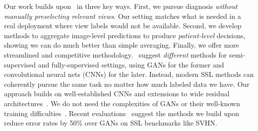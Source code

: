 Our work builds upon~\citet{madaniDeepEchocardiographyDataefficient2018} in three key ways.
First, we pursue diagnosis \emph{without manually preselecting relevant views}. Our setting matches what is needed in a real deployment where view labels would not be available.
Second, we develop methods to aggregate image-level predictions to produce \emph{patient-level} decisions, showing we can do much better than simple averaging.
Finally, we offer more streamlined and competitive methodology.~\citet{madaniDeepEchocardiographyDataefficient2018} suggest \emph{different} methods for semi-supervised and fully-supervised settings, using GANs for the former and convolutional neural nets (CNNs) for the later.
Instead, modern SSL methods can coherently pursue the same task no matter how much labeled data we have.
Our approach builds on well-established CNNs and extensions to wide residual architectures~\citep{zagoruykoWideResidualNetworks2017}.
We do not need the complexities of GANs or their well-known training difficulties~\citep{metzUnrolledGenerativeAdversarial2017,aroraGANsActuallyLearn2017}. 
Recent evaluations~\citep[Table 4]{miyatoVirtualAdversarialTraining2019} suggest the methods we build upon reduce error rates by 50\% over GANs on SSL benchmarks like SVHN.



